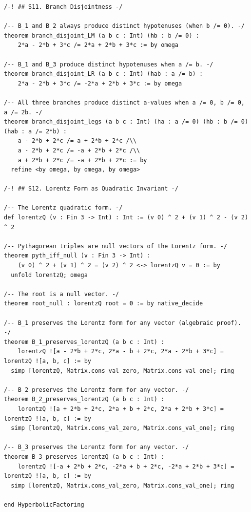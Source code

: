 \documentclass[11pt,openright,twoside]{book}
\theoremstyle{definition}
\begin{document}
\begin{lstlisting}[style=lean]
/-! ## S11. Branch Disjointness -/

/-- B_1 and B_2 always produce distinct hypotenuses (when b /= 0). -/
theorem branch_disjoint_LM (a b c : Int) (hb : b /= 0) :
    2*a - 2*b + 3*c /= 2*a + 2*b + 3*c := by omega

/-- B_1 and B_3 produce distinct hypotenuses when a /= b. -/
theorem branch_disjoint_LR (a b c : Int) (hab : a /= b) :
    2*a - 2*b + 3*c /= -2*a + 2*b + 3*c := by omega

/-- All three branches produce distinct a-values when a /= 0, b /= 0, a /= 2b. -/
theorem branch_disjoint_legs (a b c : Int) (ha : a /= 0) (hb : b /= 0) (hab : a /= 2*b) :
    a - 2*b + 2*c /= a + 2*b + 2*c /\\
    a - 2*b + 2*c /= -a + 2*b + 2*c /\\
    a + 2*b + 2*c /= -a + 2*b + 2*c := by
  refine <by omega, by omega, by omega>

/-! ## S12. Lorentz Form as Quadratic Invariant -/

/-- The Lorentz quadratic form. -/
def lorentzQ (v : Fin 3 -> Int) : Int := (v 0) ^ 2 + (v 1) ^ 2 - (v 2) ^ 2

/-- Pythagorean triples are null vectors of the Lorentz form. -/
theorem pyth_iff_null (v : Fin 3 -> Int) :
    (v 0) ^ 2 + (v 1) ^ 2 = (v 2) ^ 2 <-> lorentzQ v = 0 := by
  unfold lorentzQ; omega

/-- The root is a null vector. -/
theorem root_null : lorentzQ root = 0 := by native_decide

/-- B_1 preserves the Lorentz form for any vector (algebraic proof). -/
theorem B_1_preserves_lorentzQ (a b c : Int) :
    lorentzQ ![a - 2*b + 2*c, 2*a - b + 2*c, 2*a - 2*b + 3*c] = lorentzQ ![a, b, c] := by
  simp [lorentzQ, Matrix.cons_val_zero, Matrix.cons_val_one]; ring

/-- B_2 preserves the Lorentz form for any vector. -/
theorem B_2_preserves_lorentzQ (a b c : Int) :
    lorentzQ ![a + 2*b + 2*c, 2*a + b + 2*c, 2*a + 2*b + 3*c] = lorentzQ ![a, b, c] := by
  simp [lorentzQ, Matrix.cons_val_zero, Matrix.cons_val_one]; ring

/-- B_3 preserves the Lorentz form for any vector. -/
theorem B_3_preserves_lorentzQ (a b c : Int) :
    lorentzQ ![-a + 2*b + 2*c, -2*a + b + 2*c, -2*a + 2*b + 3*c] = lorentzQ ![a, b, c] := by
  simp [lorentzQ, Matrix.cons_val_zero, Matrix.cons_val_one]; ring

end HyperbolicFactoring

\end{lstlisting}
\end{document}
